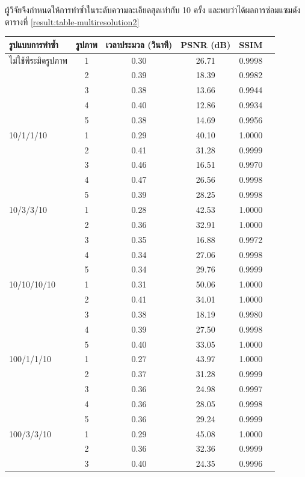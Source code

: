 \hspace{1cm} ผู้วิจัยจึงกำหนดให้การทำซ้ำในระดับความละเอียดสุดเท่ากับ 10 ครั้ง และพบว่าได้ผลการซ่อมแซมดังตารางที่ \ref{result:table-multiresolution2}
\begin{table}[H]
    \centering
	\small
	\begin{tabular}[ht]{|l|c|c|c|c|c|}
		\hline
		รูปแบบการทำซ้ำ  & รูปภาพ &เวลาประมวล  (วินาที) & PSNR (dB) & SSIM \\
		\hline
		ไม่ใช้พีระมิดรูปภาพ & 1 & 0.30  & 26.71  & 0.9998 \\ 
		& 2 & 0.39  & 18.39  & 0.9982 \\
		& 3 & 0.38 & 13.66  & 0.9944 \\
		& 4 & 0.40  & 12.86 & 0.9934 \\
		& 5 & 0.38 & 14.69 &  0.9956\\
		\hline
		10/1/1/10 & 1 & 0.29 & 40.10 & 1.0000\\
		& 2 & 0.41 & 31.28 & 0.9999 \\
		& 3 & 0.46 & 16.51 & 0.9970 \\
		& 4 & 0.47 & 26.56 & 0.9998\\
		& 5 & 0.39 & 28.25 & 0.9998 \\
		\hline
		10/3/3/10  & 1 & 0.28 & 42.53 & 1.0000\\
		& 2 & 0.36 & 32.91 & 1.0000 \\
		& 3 & 0.35 & 16.88 & 0.9972 \\
		& 4 & 0.34 & 27.06 &  0.9998 \\
		& 5 & 0.34 & 29.76 & 0.9999 \\
		\hline
		10/10/10/10  & 1 & 0.31 & 50.06 & 1.0000 \\
		& 2 & 0.41 & 34.01 & 1.0000\\
		& 3 & 0.38 & 18.19 & 0.9980\\
		& 4 & 0.39 & 27.50 & 0.9998\\
		& 5 & 0.40 & 33.05 &  1.0000\\
		\hline
		100/1/1/10  & 1 & 0.27 & 43.97 & 1.0000 \\
		& 2 & 0.37  & 31.28 & 0.9999\\
		& 3 & 0.36 & 24.98 & 0.9997\\
		& 4 & 0.36  &28.05 & 0.9998\\
		& 5 & 0.36 & 29.24 & 0.9999 \\
		\hline
		100/3/3/10  & 1 & 0.29 & 45.08& 1.0000 \\
		& 2 & 0.36 & 32.36 & 0.9999\\
		& 3 & 0.40 & 24.35 & 0.9996\\

\end{tabular}
\end{table}
